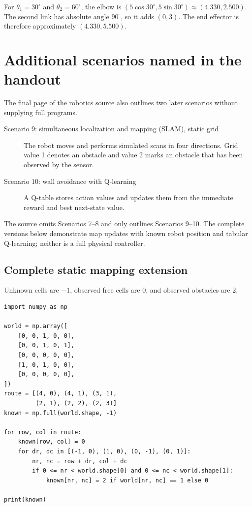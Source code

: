 \begin{workedexample}
For \(\theta_1=30^\circ\) and \(\theta_2=60^\circ\), the elbow is
\((5\cos30^\circ,5\sin30^\circ)\approx(4.330,2.500)\). The second link has absolute angle \(90^\circ\), so it adds \((0,3)\). The end effector is therefore approximately \((4.330,5.500)\).
\end{workedexample}

\section{Additional scenarios named in the handout}

The final page of the robotics source also outlines two later scenarios without supplying full programs.

\begin{description}
  \item[Scenario 9: simultaneous localization and mapping (SLAM), static grid] The robot moves and performs simulated scans in four directions. Grid value 1 denotes an obstacle and value 2 marks an obstacle that has been observed by the sensor.
  \item[Scenario 10: wall avoidance with Q-learning] A Q-table stores action values and updates them from the immediate reward and best next-state value.
\end{description}

\begin{secondpass}
The source omits Scenarios 7--8 and only outlines Scenarios 9--10. The complete versions below demonstrate map updates with known robot position and tabular Q-learning; neither is a full physical controller.
\end{secondpass}

\subsection{Complete static mapping extension}

Unknown cells are \(-1\), observed free cells are 0, and observed obstacles are 2.

\begin{lstlisting}[style=mlpython]
import numpy as np

world = np.array([
    [0, 0, 1, 0, 0],
    [0, 0, 1, 0, 1],
    [0, 0, 0, 0, 0],
    [1, 0, 1, 0, 0],
    [0, 0, 0, 0, 0],
])
route = [(4, 0), (4, 1), (3, 1),
         (2, 1), (2, 2), (2, 3)]
known = np.full(world.shape, -1)

for row, col in route:
    known[row, col] = 0
    for dr, dc in [(-1, 0), (1, 0), (0, -1), (0, 1)]:
        nr, nc = row + dr, col + dc
        if 0 <= nr < world.shape[0] and 0 <= nc < world.shape[1]:
            known[nr, nc] = 2 if world[nr, nc] == 1 else 0

print(known)
\end{lstlisting}


